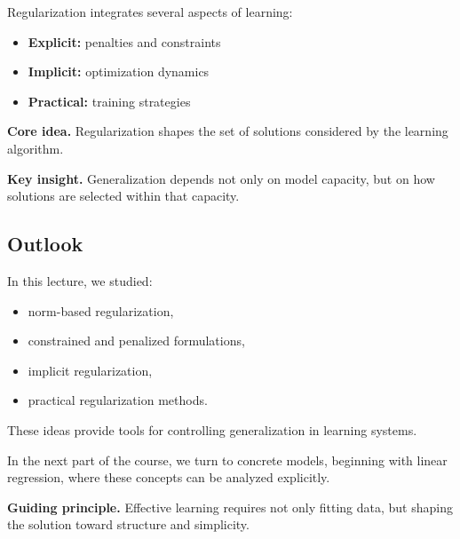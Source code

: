 Regularization integrates several aspects of learning:

\begin{itemize}
    \item \textbf{Explicit:} penalties and constraints
    \item \textbf{Implicit:} optimization dynamics
    \item \textbf{Practical:} training strategies
\end{itemize}

\medskip

\noindent
\textbf{Core idea.}  
Regularization shapes the set of solutions considered by the learning algorithm.

\medskip

\noindent
\textbf{Key insight.}  
Generalization depends not only on model capacity, but on how solutions are selected within that capacity.

\subsection{Outlook}

In this lecture, we studied:

\begin{itemize}
    \item norm-based regularization,
    \item constrained and penalized formulations,
    \item implicit regularization,
    \item practical regularization methods.
\end{itemize}

\medskip

\noindent
These ideas provide tools for controlling generalization in learning systems.

\medskip

\noindent
In the next part of the course, we turn to concrete models, beginning with linear regression, where these concepts can be analyzed explicitly.

\medskip

\noindent
\textbf{Guiding principle.}  
Effective learning requires not only fitting data, but shaping the solution toward structure and simplicity.